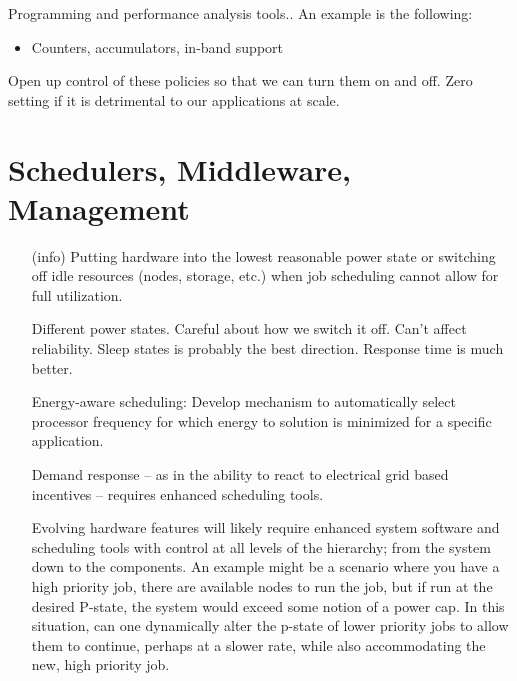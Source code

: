 \begin{itemize}
Programming and performance analysis tools.. An example is the following: 
\begin{itemize}
\item
Counters, accumulators, in-band support
\end{itemize}

Open up control of these policies so that we can turn them on and off.  Zero setting if it is detrimental to our applications at scale. 
\end{itemize}

\section{Schedulers, Middleware, Management}
\begin{itemize}
\item[(info)]
Putting hardware into the lowest reasonable power state or switching off idle resources (nodes, storage, etc.) when job scheduling cannot allow for full utilization. 

Different power states. Careful about how we switch it off.  Can’t affect reliability.  Sleep states is probably the best direction.  Response time is much better.

Energy-aware scheduling: Develop mechanism to automatically select processor frequency for which energy to solution is minimized for a specific application.

Demand response – as in the ability to react to electrical grid based incentives – requires enhanced scheduling tools. 

Evolving hardware features will likely require enhanced system software and scheduling tools with control at all levels of the hierarchy; from the system down to the components.  An example might be a scenario where you have a high priority job, there are available nodes to run the job, but if run at the desired P-state, the system would exceed some notion of a power cap.  In this situation, can one dynamically alter the p-state of lower priority jobs to allow them to continue, perhaps at a slower rate, while also accommodating the new, high priority job.
\end{itemize}

